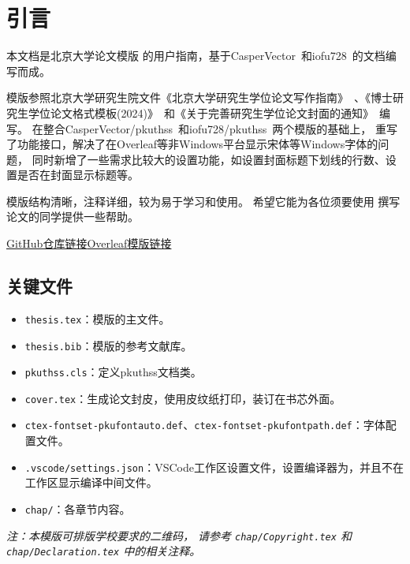 \chapter{引言}
\label{chap:intro}

\def\GitHubLink{\href{https://github.com/zhiyunyao/pkuthss/tree/lite}{GitHub仓库链接}}
\def\OverleafLink{\href{https://www.overleaf.com/read/wmsmytgjkxfy\#c888f2}{Overleaf模版链接}}

本文档是北京大学论文模版 \pkuthss{} 的用户指南，基于CasperVector~\cite{casperpkuthss2011}和iofu728~\cite{iofu728pkuthss2021}的文档编写而成。

\pkuthss{}模版参照北京大学研究生院文件《北京大学研究生学位论文写作指南》~\cite{pku-thesisguide}、《博士研究生学位论文格式模板(2024)》~\cite{pku-thesisstyle}和《关于完善研究生学位论文封面的通知》~\cite{pku-thesiscover}编写。
在整合CasperVector/pkuthss~\cite{casperpkuthss2011}和iofu728/pkuthss~\cite{iofu728pkuthss2021}两个模版的基础上，
重写了功能接口，解决了在Overleaf等非Windows平台显示宋体等Windows字体的问题，
同时新增了一些需求比较大的设置功能，如设置封面标题下划线的行数、设置是否在封面显示标题等。

\pkuthss{}模版结构清晰，注释详细，较为易于学习和使用。
希望它能为各位须要使用  撰写论文的同学提供一些帮助。

\GitHubLink \quad \OverleafLink

\section{关键文件}
\begin{itemize}
    \item \verb|thesis.tex|：模版的主文件。
    \item \verb|thesis.bib|：模版的参考文献库。
    \item \verb|pkuthss.cls|：定义pkuthss文档类。
    \item \verb|cover.tex|：生成论文封皮，使用皮纹纸打印，装订在书芯外面。
    \item \verb|ctex-fontset-pkufontauto.def|、\verb|ctex-fontset-pkufontpath.def|：字体配置文件。
    \item \verb|.vscode/settings.json|：VSCode工作区设置文件，设置编译器为，并且不在工作区显示编译中间文件。
    \item \verb|chap/|：各章节内容。
\end{itemize}
\emph{
    注：本模版可排版学校要求的二维码，
    请参考 \texttt{chap/Copyright.tex} 和 \texttt{chap/Declaration.tex} 中的相关注释。
}

